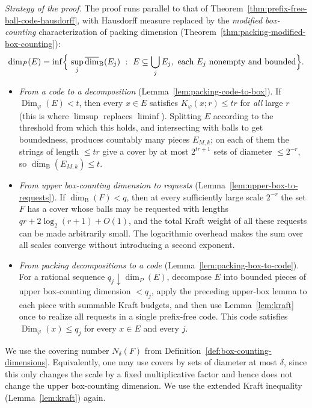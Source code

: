 \documentclass[a4paper,oneside,reqno,12pt]{amsart}
\theoremstyle{plain}
\theoremstyle{definition}
\theoremstyle{remark}
\DeclareMathOperator{\Dim}{Dim}
\begin{document}
\medskip
\noindent\textit{Strategy of the proof.}
The proof runs parallel to that of
Theorem~\ref{thm:prefix-free-ball-code-hausdorff}, with Hausdorff measure
replaced by the \emph{modified box-counting} characterization of packing
dimension (Theorem~\ref{thm:packing-modified-box-counting}):
\[
\dim_P(E)=\inf\Bigl\{\ \sup_j \overline{\dim}_{\mathrm B}(E_j)\ :\
E\subseteq\bigcup_{j}E_j,\ \text{each }E_j\text{ nonempty and bounded}\Bigr\}.
\]
\begin{itemize}
\item \emph{From a code to a decomposition} (Lemma~\ref{lem:packing-code-to-box}).
  If \(\Dim_\varphi(E)<t\), then every \(x\in E\) satisfies \(K_\varphi(x;r)\le tr\)
  for \emph{all} large \(r\) (this is where \(\limsup\) replaces \(\liminf\)).
  Splitting \(E\) according to the threshold from which this holds, and
  intersecting with balls to get boundedness, produces countably many pieces
  \(E_{M,k}\); on each of them the strings of length \(\le tr\) give a cover by at
  most \(2^{tr+1}\) sets of diameter \(\le 2^{-r}\), so
  \(\overline{\dim}_{\mathrm B}(E_{M,k})\le t\).
\item \emph{From upper box-counting dimension to requests}
  (Lemma~\ref{lem:upper-box-to-requests}).  If
  \(\overline{\dim}_{\mathrm B}(F)<q\), then at every sufficiently large scale
  \(2^{-r}\) the set \(F\) has a cover whose balls may be requested with lengths
  \(qr+2\log_2(r+1)+O(1)\), and the total Kraft weight of all these requests can
  be made arbitrarily small.  The logarithmic overhead makes the sum over all scales
  converge without introducing a second exponent.
\item \emph{From packing decompositions to a code}
  (Lemma~\ref{lem:packing-box-to-code}).
  For a rational sequence \(q_j\downarrow\dim_P(E)\),
  decompose \(E\) into bounded pieces of upper box-counting dimension
  \(<q_j\), apply the preceding upper-box lemma to each piece with summable Kraft budgets,
  and then use Lemma~\ref{lem:kraft} once to realize all requests in a
  single prefix-free code.
  This code satisfies \(\Dim_\varphi(x)\le q_j\) for
  every \(x\in E\) and every \(j\).
\end{itemize}

We use the covering number \(N_\delta(F)\) from
Definition~\ref{def:box-counting-dimensions}.  Equivalently, one may use covers
by sets of diameter at most \(\delta\), since this only changes the scale by a
fixed multiplicative factor and hence does not change the upper box-counting dimension.
We use the extended Kraft inequality (Lemma~\ref{lem:kraft}) again.
\end{document}
